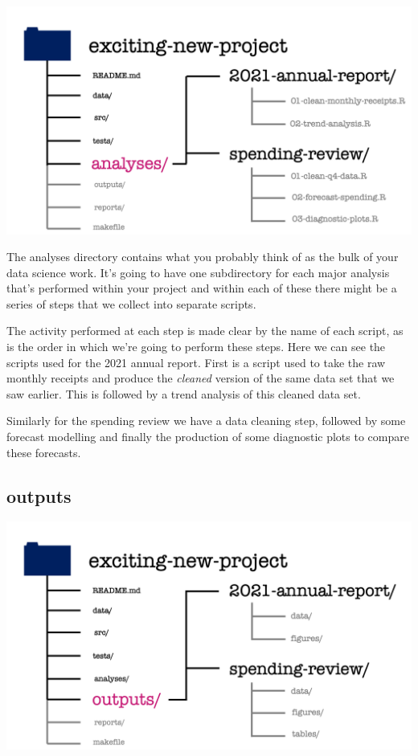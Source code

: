 \documentclass[
  12pt,
]{book}
\begin{document}
\includegraphics[width=0.8\linewidth]{images/101-workflows-organising-your-work/directory-structure-drawings/directory-structure-drawing-23}

The analyses directory contains what you probably think of as the bulk of your
data science work. It's going to have one subdirectory for each major analysis that's performed within your project and within each of these there might be a series of steps that we collect into separate scripts.

The activity performed at each step is made clear by the name of each script, as is the order in which we're going to perform these steps. Here we can see the scripts used for the 2021 annual report. First is a script used to take the raw monthly receipts and produce the \emph{cleaned} version of the same data set that we saw earlier.
This is followed by a trend analysis of this cleaned data set.

Similarly for the spending review we have a data cleaning step, followed by some forecast modelling and finally the production of some diagnostic plots to compare these
forecasts.

\hypertarget{outputs}{%
\subsection{outputs}\label{outputs}}

\includegraphics[width=0.8\linewidth]{images/101-workflows-organising-your-work/directory-structure-drawings/directory-structure-drawing-26}
\end{document}
